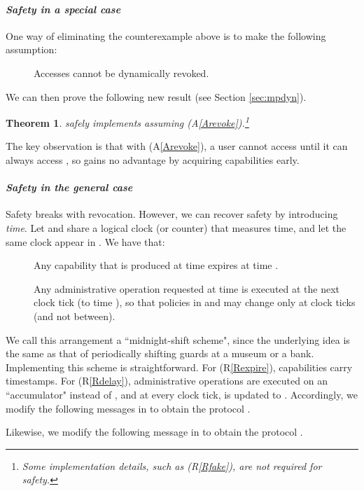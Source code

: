 \documentclass[10pt]{article}
\makeatletter
\newtheorem{theorem}{Theorem}
\newcounter{Crules}
\newcounter{Cassums}
\newcommand{\R}{\addtocounter{Crules}{1}R\arabic{Crules}\gdef\@currentlabel{\arabic{Crules}}}
\newcommand{\A}{\addtocounter{Cassums}{1}A\arabic{Cassums}\gdef\@currentlabel{\arabic{Cassums}}}
\makeatother
\begin{document}
\paragraph{\em Safety in a special case}
One way of eliminating the counterexample above is to make the following assumption:
\begin{description}
\item[\A]\label{Arevoke} Accesses cannot be dynamically revoked.
\end{description}
We can then prove the following new result (see Section \ref{sec:mpdyn}).
\begin{theorem}
 safely implements  assuming {\rm (A\ref{Arevoke})}.\footnote{Some implementation details, such as (R\ref{Rfake}), are not required for safety.} 
\end{theorem}
\noindent
The key observation is that with (A\ref{Arevoke}), a user  cannot access  until it can always access , so  gains no advantage by acquiring capabilities early.



\paragraph{\em Safety in the general case}
Safety breaks with revocation. However, we can recover
safety by introducing \emph{time}. Let  and  share a logical clock (or counter) that measures time, and let the same clock appear in . We have that:
\begin{description}
\item[\R]\label{Rexpire} Any capability that is produced at time  expires at time .\item[\R]\label{Rdelay} Any administrative operation requested at time  is executed at the next clock tick (to time ), so that policies in  and  may change only at clock ticks (and not between).  
\end{description}

\noindent
We call this arrangement a ``midnight-shift scheme", since the underlying idea is the same as that of periodically shifting guards at a museum or a bank. Implementing this scheme is straightforward. For (R\ref{Rexpire}), capabilities carry timestamps. For (R\ref{Rdelay}), administrative operations are executed on an ``accumulator"  instead of , and at every clock tick,  is updated to . Accordingly, we modify the following messages in  to obtain the protocol . 

Likewise, we modify the following message in  to obtain the protocol .
 
\end{document}
